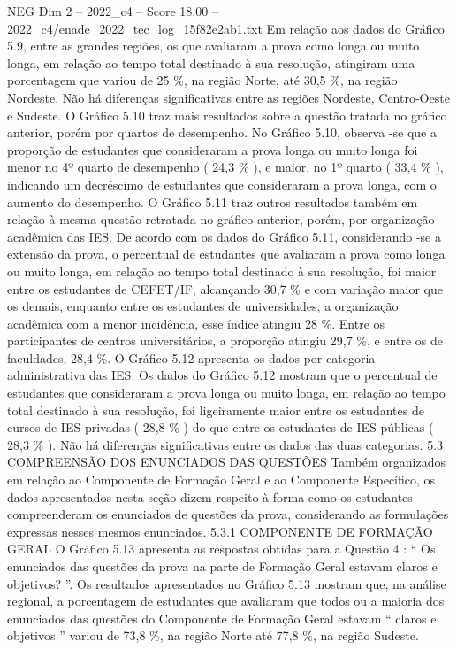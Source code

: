 \begin{textsample}{NEG Dim 2 – 2022\_c4 – Score 18.00 – 2022\_c4/enade\_2022\_tec\_log\_15f82e2ab1.txt}
Em relação aos dados do Gráfico 5.9, entre as grandes regiões, os que avaliaram a prova como longa ou muito longa, em relação ao tempo total destinado à sua resolução, atingiram uma porcentagem que variou de 25 \%, na região Norte, até 30,5 \%, na região Nordeste.
Não há diferenças significativas entre as regiões Nordeste, Centro-Oeste e Sudeste.
O Gráfico 5.10 traz mais resultados sobre a questão tratada no gráfico anterior, porém por quartos de desempenho.
No Gráfico 5.10, observa -se que a proporção de estudantes que consideraram a prova longa ou muito longa foi menor no 4º quarto de desempenho ( 24,3 \% ), e maior, no 1º quarto ( 33,4 \% ), indicando um decréscimo de estudantes que consideraram a prova longa, com o aumento do desempenho.
O Gráfico 5.11 traz outros resultados também em relação à mesma questão retratada no gráfico anterior, porém, por organização acadêmica das IES.
De acordo com os dados do Gráfico 5.11, considerando -se a extensão da prova, o percentual de estudantes que avaliaram a prova como longa ou muito longa, em relação ao tempo total destinado à sua resolução, foi maior entre os estudantes de CEFET/IF, alcançando 30,7 \% e com variação maior que os demais, enquanto entre os estudantes de universidades, a organização acadêmica com a menor incidência, esse índice atingiu 28 \%.
Entre os participantes de centros universitários, a proporção atingiu 29,7 \%, e entre os de faculdades, 28,4 \%.
O Gráfico 5.12 apresenta os dados por categoria administrativa das IES.
Os dados do Gráfico 5.12 mostram que o percentual de estudantes que consideraram a prova longa ou muito longa, em relação ao tempo total destinado à sua resolução, foi ligeiramente maior entre os estudantes de cursos de IES privadas ( 28,8 \% ) do que entre os estudantes de IES públicas ( 28,3 \% ).
Não há diferenças significativas entre os dados das duas categorias. 5.3 COMPREENSÃO DOS ENUNCIADOS DAS QUESTÕES Também organizados em relação ao Componente de Formação Geral e ao Componente Específico, os dados apresentados nesta seção dizem respeito à forma como os estudantes compreenderam os enunciados de questões da prova, considerando as formulações expressas nesses mesmos enunciados. 5.3.1 COMPONENTE DE FORMAÇÃO GERAL O Gráfico 5.13 apresenta as respostas obtidas para a Questão 4 : “ Os enunciados das questões da prova na parte de Formação Geral estavam claros e objetivos? ”.
Os resultados apresentados no Gráfico 5.13 mostram que, na análise regional, a porcentagem de estudantes que avaliaram que todos ou a maioria dos enunciados das questões do Componente de Formação Geral estavam “ claros e objetivos ” variou de 73,8 \%, na região Norte até 77,8 \%, na região Sudeste.

\end{textsample}
